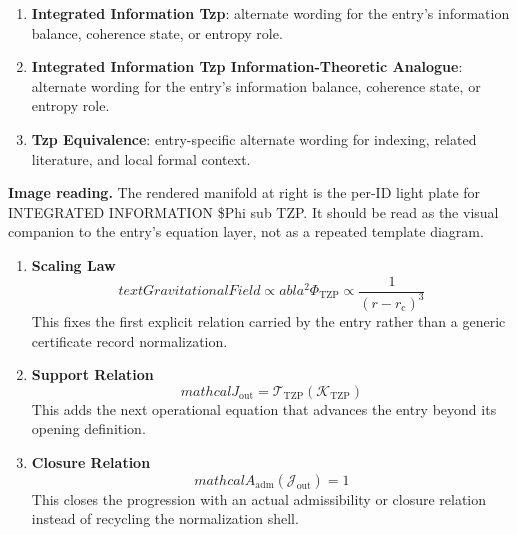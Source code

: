\begin{enumerate}[leftmargin=1.6em,itemsep=6pt,topsep=4pt]
\item \textbf{Integrated Information Tzp}: alternate wording for the entry's information balance, coherence state, or entropy role.
\item \textbf{Integrated Information Tzp Information-Theoretic Analogue}: alternate wording for the entry's information balance, coherence state, or entropy role.
\item \textbf{Tzp Equivalence}: entry-specific alternate wording for indexing, related literature, and local formal context.
\end{enumerate}

\begin{samepage}
\noindent\begin{minipage}[t]{0.45\linewidth}
\vspace{0pt}
\raggedright
\scriptsize\textbf{Image reading.} The rendered manifold at right is the per-ID light plate for INTEGRATED INFORMATION \$Phi sub TZP. It should be read as the visual companion to the entry's equation layer, not as a repeated template diagram.\par
\end{minipage}\hfill
\begin{minipage}[t]{0.53\linewidth}
\vspace*{-0.10in}
\raggedright
{}
\end{minipage}
\end{samepage}

\clearpage


\begin{enumerate}[leftmargin=1.6em,itemsep=9pt,topsep=6pt]
\item \textbf{Scaling Law}
\[
text{Gravitational Field} \propto  abla^2 \Phi_{\text{TZP}} \propto \frac{1}{(r - r_{\mathrm{c}})^3}
\]
This fixes the first explicit relation carried by the entry rather than a generic certificate record normalization.

\item \textbf{Support Relation}
\[
mathcal{J}_{\mathrm{out}} = \mathcal{T}_{\mathrm{TZP}}\!\left(\mathcal{K}_{\mathrm{TZP}}\right)
\]
This adds the next operational equation that advances the entry beyond its opening definition.

\item \textbf{Closure Relation}
\[
mathcal{A}_{\mathrm{adm}}\!\left(\mathcal{J}_{\mathrm{out}}\right)=1
\]
This closes the progression with an actual admissibility or closure relation instead of recycling the normalization shell.
\end{enumerate}

